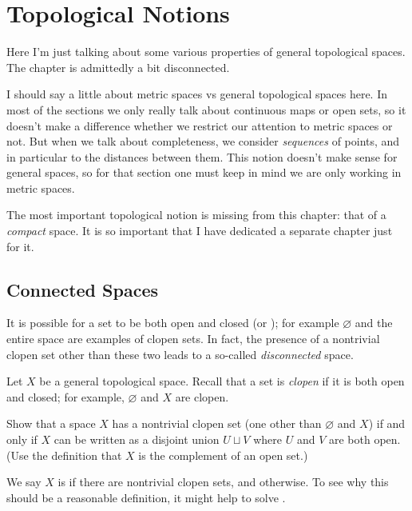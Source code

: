 \chapter{Topological Notions}
Here I'm just talking about some various properties of general topological spaces.
The chapter is admittedly a bit disconnected.

I should say a little about metric spaces vs general topological spaces here.
In most of the sections we only really talk about continuous maps or open sets,
so it doesn't make a difference whether we restrict our attention to metric spaces or not.
But when we talk about completeness, we consider \emph{sequences} of points,
and in particular to the distances between them.
This notion doesn't make sense for general spaces, so for that section one must
keep in mind we are only working in metric spaces.

The most important topological notion is missing from this chapter:
that of a \emph{compact} space.
It is so important that I have dedicated a separate chapter just for it.


\section{Connected Spaces}
It is possible for a set to be both open and closed (or );
for example $\varnothing$ and the entire space are examples of clopen sets.
In fact, the presence of a nontrivial clopen set other than these two leads
to a so-called \emph{disconnected} space.

Let $X$ be a general topological space.
Recall that a set is \emph{clopen} if it is both open and closed;
for example, $\varnothing$ and $X$ are clopen.

\begin{ques}
	Show that a space $X$ has a nontrivial clopen set
	(one other than $\varnothing$ and $X$)
	if and only if $X$ can be written as a disjoint union $U \sqcup V$
	where $U$ and $V$ are both open.
	(Use the definition that $X$ is the complement of an open set.)
\end{ques}

We say $X$ is  if there are nontrivial clopen sets,
and  otherwise.
To see why this should be a reasonable definition, it might help
to solve .

